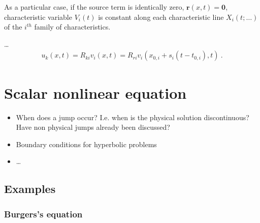 \documentclass[letterpaper,10pt,english]{jupyterBook}
\begin{document}
\sphinxAtStartPar
{} As a particular case, if the source term is identically zero, \(\mathbf{r}(x,t) = \mathbf{0}\), characteristic variable \(V_i(t)\) is constant along each characteristic line \(X_i(t;\dots)\) of the \(i^{th}\) family of characteristics.

\sphinxAtStartPar
…
\begin{equation*}
\begin{split}u_k(x,t) = R_{ki} v_i(x,t) = R_{ri} v_i(x_{0,i} + s_i(t-t_{0,i}), t) \ .\end{split}
\end{equation*}
\sphinxstepscope


\section{Scalar non\sphinxhyphen{}linear equation}
\label{\detokenize{ch/pde/hyperbolic-1d-scalar-nonlinear:scalar-non-linear-equation}}\label{\detokenize{ch/pde/hyperbolic-1d-scalar-nonlinear:pde-hyperbolic-problems-1d-scalar-nonlinear}}\label{\detokenize{ch/pde/hyperbolic-1d-scalar-nonlinear::doc}}
\sphinxAtStartPar
{}
\begin{itemize}
\item {} 
\sphinxAtStartPar
When does a jump occur? I.e. when is the physical solution discontinuous? Have non physical jumps already been discussed?

\item {} 
\sphinxAtStartPar
Boundary conditions for hyperbolic problems

\item {} 
\sphinxAtStartPar
…

\end{itemize}


\subsection{Examples}
\label{\detokenize{ch/pde/hyperbolic-1d-scalar-nonlinear:examples}}\label{\detokenize{ch/pde/hyperbolic-1d-scalar-nonlinear:pde-hyperbolic-problems-scalar-nonlinear-examples}}

\subsubsection{Burgers’s equation}
\label{\detokenize{ch/pde/hyperbolic-1d-scalar-nonlinear:burgers-s-equation}}\label{\detokenize{ch/pde/hyperbolic-1d-scalar-nonlinear:pde-hyperbolic-problems-scalar-nonlinear-examples-burgers}}
\end{document}
